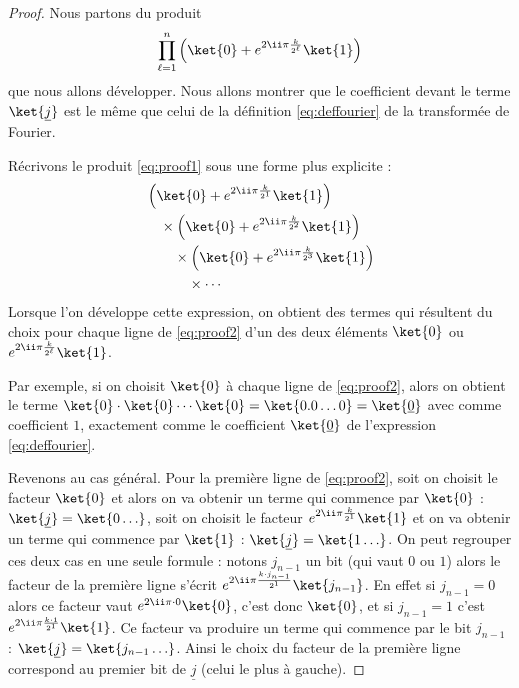 \documentclass[11pt,class=report,crop=false]{standalone}
\begin{document}
 
\begin{proof}
Nous partons du produit 
\begin{equation}
\label{eq:proof1}
\prod_{\ell=1}^{n} \left( \ket{0} + e^{2\ii \pi \frac{k}{2^\ell}} \ket{1} \right)
\end{equation}
que nous allons développer. 
Nous allons montrer que le coefficient devant le terme $\ket{\underline j}$ est le même que celui de la définition \eqref{eq:deffourier} de la transformée de Fourier.


Récrivons le produit \eqref{eq:proof1} sous une forme plus explicite :
\begin{align}
\label{eq:proof2}
\begin{split}
&\left(\ket{0} + e^{2\ii \pi \frac{k}{2^1}} \ket{1}  \right) \\
&\quad \times \left(\ket{0} + e^{2\ii \pi \frac{k}{2^2}} \ket{1}  \right) \\ 
&\quad\quad \times \left(\ket{0} + e^{2\ii \pi \frac{k}{2^3}} \ket{1}  \right) \\ 
&\quad\quad\quad \times \cdots \\
\end{split}
\end{align}
Lorsque l'on développe cette expression, on obtient des termes qui résultent du choix pour chaque ligne de \eqref{eq:proof2} d'un des deux éléments $\ket{0}$ ou $e^{2\ii \pi \frac{k}{2^\ell}} \ket{1}$.

Par exemple, si on choisit $\ket{0}$ à chaque ligne de \eqref{eq:proof2}, alors on obtient le terme $\ket{0}\cdot\ket{0}\cdots\ket{0} = \ket{0.0\ldots0}=\ket{\underline{0}}$ avec comme coefficient $1$, exactement comme le coefficient $\ket{\underline{0}}$ de l'expression \eqref{eq:deffourier}.

Revenons au cas général. Pour la première ligne de \eqref{eq:proof2}, soit on choisit 
le facteur $\ket{0}$ et alors on va obtenir un terme qui commence par $\ket{0}$ :  $\ket{\underline j} = \ket{0\ldots}$,  
soit on choisit le facteur $e^{2\ii \pi \frac{k}{2^1}} \ket{1}$
et on va obtenir un terme qui commence par $\ket{1}$ : $\ket{\underline j} = \ket{1\ldots}$. On peut regrouper ces deux cas en une seule formule :
notons  $j_{n-1}$ un bit (qui vaut $0$ ou $1$)
alors le facteur de la première ligne s'écrit $e^{2\ii \pi \frac{k \cdot j_{n-1}}{2^1}} \ket{j_{n-1}}$. En effet si $j_{n-1}=0$ alors ce facteur vaut $e^{2\ii\pi \cdot 0} \ket{0}$,
c'est donc $\ket{0}$, et si $j_{n-1}=1$ c'est
$e^{2\ii \pi \frac{k \cdot 1}{2^1}} \ket{1}$.
Ce facteur va produire un terme qui commence par le bit $j_{n-1}$ : 
$\ket{\underline{j}} = \ket{j_{n-1}\ldots}$. Ainsi le choix du facteur de la première ligne  correspond au premier bit de $\underline{j}$ (celui le plus à gauche).


\end{proof}
\end{document}
